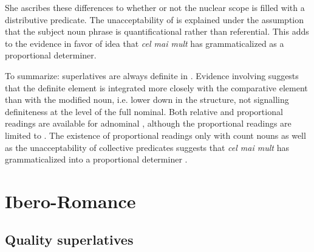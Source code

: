 \documentclass[output=paper
,modfonts
,nonflat]{langsci/langscibook}
\begin{document}
\z

\z 

She ascribes these differences to whether or not the nuclear scope is filled with a distributive predicate. The unacceptability of  is explained under the assumption that the subject  noun phrase is quantificational rather than referential. This adds to the  evidence in favor of  idea that \textit{cel mai mult} has grammaticalized as a proportional determiner.

To summarize:  superlatives are always definite in . Evidence involving  suggests that the definite element is integrated more closely with the comparative element than with the modified noun, i.e. lower down in the structure, not signalling definiteness at the level of the full nominal.  Both relative and proportional readings are available for adnominal , although the proportional readings are limited to . The existence of proportional readings only with count nouns as well as the unacceptability of collective predicates suggests that \textit{cel mai mult} has grammaticalized into a proportional determiner \citep{Dobrovie-Sorin2015}.

\section{Ibero-Romance}

\subsection{Quality superlatives}
\end{document}

